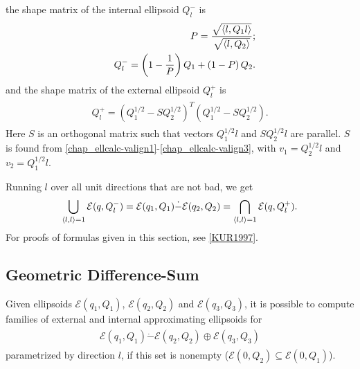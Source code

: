 \documentclass[letterpaper,10pt,english]{sphinxmanual}
\begin{document}
the shape matrix of the internal ellipsoid $Q^-_l$ is
\begin{gather}
\begin{split}\begin{aligned}
&& P = \frac{\sqrt{\langle l, Q_1 l\rangle}}{\sqrt{\langle l, Q_2 \rangle}};\nonumber\\
&& Q^-_l = \left(1 - \dfrac{1}{P}\right)Q_1 + \left(1 - P\right)Q_2.
\label{minkdiff_ia}\end{aligned}\end{split}\notag
\end{gather}
and the shape matrix of the external ellipsoid $Q^+_l$ is
\label{chap_ellcalc:equation-minkdiff_ea}\begin{gather}
\begin{split}Q^+_l = \left(Q_1^{1/2} - SQ_2^{1/2}\right)^T
\left(Q_1^{1/2} - SQ_2^{1/2}\right).\end{split}\label{chap_ellcalc-minkdiff_ea}
\end{gather}
Here $S$ is an orthogonal matrix such that vectors
$Q_1^{1/2}l$ and $SQ_2^{1/2}l$ are parallel. $S$ is
found from \eqref{chap_ellcalc-valign1}-\eqref{chap_ellcalc-valign3}, with $v_1=Q_2^{1/2}l$ and
$v_2=Q_1^{1/2}l$.

Running $l$ over all unit directions that are not bad, we get
\begin{gather}
\begin{split}\bigcup_{\langle l,l\rangle=1} {\mathcal E}(q,Q_l^-) =
{\mathcal E}(q_1,Q_1)\dot{-}{\mathcal E}(q_2,Q_2) =
\bigcap_{\langle l,l\rangle=1} {\mathcal E}(q,Q_l^+) .\end{split}\notag
\end{gather}
For proofs of formulas given in this section, see {\hyperref[chap_intro:kur1997]{{[}KUR1997{]}}}.


\subsection{Geometric Difference-Sum}
\label{chap_ellcalc:diff-sum-label}\label{chap_ellcalc:geometric-difference-sum}
Given ellipsoids ${\mathcal E}(q_1,Q_1)$,
${\mathcal E}(q_2,Q_2)$ and ${\mathcal E}(q_3,Q_3)$, it is
possible to compute families of external and internal approximating
ellipsoids for
\label{chap_ellcalc:equation-minkmp}\begin{gather}
\begin{split}{\mathcal E}(q_1,Q_1) \dot{-} {\mathcal E}(q_2,Q_2) \oplus {\mathcal E}(q_3,Q_3)\end{split}\label{chap_ellcalc-minkmp}
\end{gather}
parametrized by direction $l$, if this set is nonempty
(${\mathcal E}(0,Q_2)\subseteq{\mathcal E}(0,Q_1)$).
\end{document}
